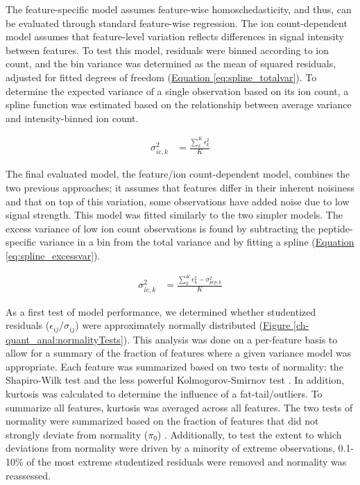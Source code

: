 The feature-specific model assumes feature-wise homoschedasticity, and thus, can be evaluated through standard feature-wise regression. The ion count-dependent model assumes that feature-level variation reflects differences in signal intensity between features. To test this model, residuals were binned according to ion count, and the bin variance was determined as the mean of squared residuals, adjusted for fitted degrees of freedom (\hyperref[eq:spline_totalvar]{Equation \ref{eq:spline_totalvar}}). To determine the expected variance of a single observation based on its ion count, a spline function was estimated based on the relationship between average variance and intensity-binned ion count.

\begin{align}
\sigma^{2}_{ic,k} &= \frac{\sum_{k}^{K}\epsilon_{k}^{2}}{K}\label{eq:spline_totalvar}
\end{align}

The final evaluated model, the feature/ion count-dependent model, combines the two previous approaches; it assumes that features differ in their inherent noisiness and that on top of this variation, some observations have added noise due to low signal strength. This model was fitted similarly to the two simpler models. The excess variance of low ion count observations is found by subtracting the peptide-specific variance in a bin from the total variance and by fitting a spline (\hyperref[eq:spline_excessvar]{Equation \ref{eq:spline_excessvar}}).

\begin{align}
\sigma^{2}_{ic,k} &= \frac{\sum_{k}^{K}\epsilon_{k}^{2} - \sigma^{2}_{pep,k}}{K}\label{eq:spline_excessvar}
\end{align}

As a first test of model performance, we determined whether studentized residuals ($\epsilon_{ij} / \sigma_{ij}$) were approximately normally distributed (\hyperref[ch-quant_anal:normalityTests]{Figure \ref{ch-quant_anal:normalityTests}}). This analysis was done on a per-feature basis to allow for a summary of the fraction of features where a given variance model was appropriate. Each feature was summarized based on two tests of normality: the Shapiro-Wilk test \cite{Shapiro:1965gf} and the less powerful Kolmogorov-Smirnov test \cite{Lilliefors:1967bh}. In addition, kurtosis was calculated to determine the influence of a fat-tail/outliers. To summarize all features, kurtosis was averaged across all features. The two tests of normality were summarized based on the fraction of features that did not strongly deviate from normality ($\pi_{0}$) \cite{Storey:2003cj}. Additionally, to test the extent to which deviations from normality were driven by a minority of extreme observations, 0.1-10\% of the most extreme studentized residuals were removed and normality was reassessed.

